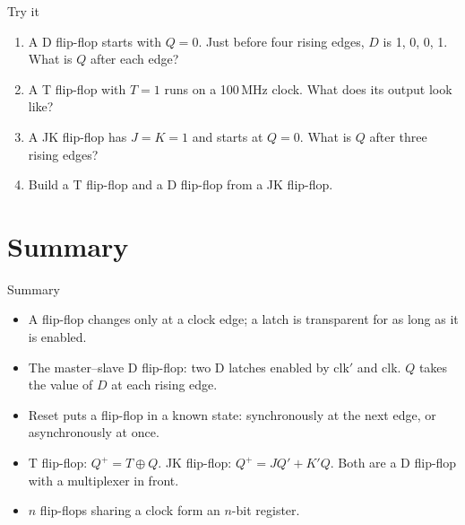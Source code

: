 \documentclass[10pt]{wosm-slides}
\begin{document}
\begin{frame}{Try it}
  \begin{enumerate}
    \item A D flip-flop starts with $Q = 0$. Just before four rising edges, $D$ is 1,
      0, 0, 1. What is $Q$ after each edge?\par
    \item A T flip-flop with $T = 1$ runs on a 100\,MHz clock. What does its output
      look like?\par
    \item A JK flip-flop has $J = K = 1$ and starts at $Q = 0$. What is $Q$ after three
      rising edges?\par
    \item Build a T flip-flop and a D flip-flop from a JK flip-flop.\par
  \end{enumerate}
\end{frame}

\section{Summary}

\begin{frame}{Summary}
  \begin{itemize}
    \item A flip-flop changes only at a clock edge; a latch is transparent for as long
      as it is enabled.
    \item The master--slave D flip-flop: two D latches enabled by $\mathrm{clk}'$ and
      clk. $Q$ takes the value of $D$ at each rising edge.
    \item Reset puts a flip-flop in a known state: synchronously at the next edge, or
      asynchronously at once.
    \item T flip-flop: $Q^{+} = T \oplus Q$. JK flip-flop: $Q^{+} = J Q' + K' Q$. Both
      are a D flip-flop with a multiplexer in front.
    \item $n$ flip-flops sharing a clock form an $n$-bit register.
  \end{itemize}
\end{frame}
\end{document}
